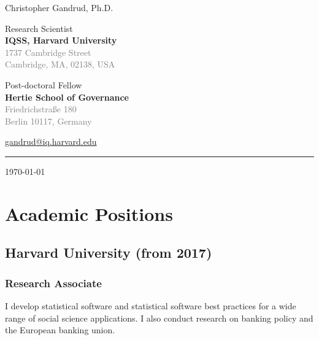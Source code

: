 \documentclass[a4paper]{article}
\begin{document}
    \begin{flushright}
        {\huge{Christopher Gandrud, Ph.D.}} \\
        \vspace{0.25cm}

        Research Scientist \\
        {\bf{\large{IQSS, Harvard University}}} \\
        \textcolor{gray}{1737 Cambridge Street \\
        Cambridge, MA, 02138, USA}

        \vspace{0.5cm}

        Post-doctoral Fellow \\
        {\bf{\large{Hertie School of Governance}}} \\
        \textcolor{gray}{Friedrichstra{\ss}e 180\\
        Berlin 10117, Germany} \\
        \vspace{0.25cm}

        \href{mailto:gandrud@iq.harvard.edu}{gandrud@iq.harvard.edu}\\[0.25cm]

        \medskip\hrule height 1pt

        \vspace{0.5cm}

        \today

    \end{flushright}



\vspace{0.5cm}

\section*{Academic Positions}

\subsection*{Harvard University (from 2017)}

\subsubsection*{Research Associate}

I develop statistical software and statistical software best practices for a wide range of social science applications. I also conduct research on banking policy and the European banking union.
\end{document}

